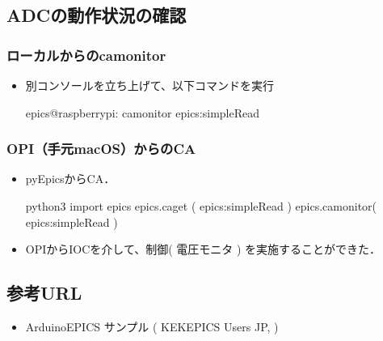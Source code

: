 \documentclass[letterpaper,10pt,dvipdfmx]{sphinxmanual}
\begin{document}
\subsection{ADCの動作状況の確認}
\label{\detokenize{epics/rst/example2__arduino_ADConvertor:adc}}

\subsubsection{ローカルからのcamonitor}
\label{\detokenize{epics/rst/example2__arduino_ADConvertor:camonitor}}\begin{itemize}
\item {} 
別コンソールを立ち上げて、以下コマンドを実行

\begin{sphinxVerbatim}[commandchars=\\\{\}]
epics@raspberrypi: \PYGZti{} \PYGZdl{} camonitor epics:simpleRead
\end{sphinxVerbatim}

\end{itemize}


\subsubsection{OPI（手元macOS）からのCA}
\label{\detokenize{epics/rst/example2__arduino_ADConvertor:opi-macos-ca}}\begin{itemize}
\item {} 
pyEpicsからCA．

\begin{sphinxVerbatim}[commandchars=\\\{\}]
\PYGZdl{} python3
\PYGZgt{}\PYGZgt{}\PYGZgt{} import epics
\PYGZgt{}\PYGZgt{}\PYGZgt{} epics.caget    ( \PYGZdq{}epics:simpleRead\PYGZdq{} )
\PYGZgt{}\PYGZgt{}\PYGZgt{} epics.camonitor( \PYGZdq{}epics:simpleRead\PYGZdq{} )
\end{sphinxVerbatim}

\item {} 
OPIからIOCを介して、制御( 電圧モニタ ) を実施することができた．

\end{itemize}


\subsection{参考URL}
\label{\detokenize{epics/rst/example2__arduino_ADConvertor:url}}\begin{itemize}
\item {} 
Arduino\sphinxhyphen{}EPICS サンプル ( KEK\sphinxhyphen{}EPICS Users JP,  )

\end{itemize}
\end{document}
